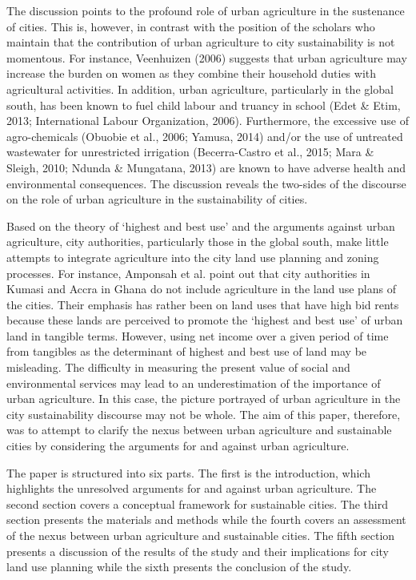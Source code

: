 The discussion points to the profound role of urban agriculture in the sustenance of cities. This is, however, in contrast with the position of the scholars who maintain that the contribution of urban agriculture to city sustainability is not momentous. For instance, Veenhuizen (2006) suggests that urban agriculture may increase the burden on women as they combine their household duties with agricultural activities. In addition, urban agriculture, particularly in the global south, has been known to fuel child labour and truancy in school (Edet \& Etim, 2013; International Labour Organization, 2006). Furthermore, the excessive use of agro-chemicals (Obuobie et al., 2006; Yamusa, 2014) and/or the use of untreated wastewater for unrestricted irrigation \cite{Amponsah2015, Amponsah2016} (Becerra-Castro et al., 2015; Mara \& Sleigh, 2010; Ndunda \& Mungatana, 2013) are known to have adverse health and environmental consequences. The discussion reveals the two-sides of the discourse on the role of urban agriculture in the sustainability of cities.

Based on the theory of ‘highest and best use’ and the arguments against urban agriculture, city authorities, particularly those in the global south, make little attempts to integrate agriculture into the city land use planning and zoning processes. For instance, Amponsah et al. \cite{Amponsah2015, Amponsah2016} point out that city authorities in Kumasi and Accra in Ghana do not include agriculture in the land use plans of the cities. Their emphasis has rather been on land uses that have high bid rents because these lands are perceived to promote the ‘highest and best use’ of urban land in tangible terms. However, using net income over a given period of time from tangibles \cite{Fisher1954} as the determinant of highest and best use of land may be misleading. The difficulty in measuring the present value of social and environmental services may lead to an underestimation of the importance of urban agriculture. In this case, the picture portrayed of urban agriculture in the city sustainability discourse may not be whole. The aim of this paper, therefore, was to attempt to clarify the nexus between urban agriculture and sustainable cities by considering the arguments for and against urban agriculture.

The paper is structured into six parts. The first is the introduction, which highlights the unresolved arguments for and against urban agriculture. The second section covers a conceptual framework for sustainable cities. The third section presents the materials and methods while the fourth covers an assessment of the nexus between urban agriculture and sustainable cities. The fifth section presents a discussion of the results of the study and their implications for city land use planning while the sixth presents the conclusion of the study.

